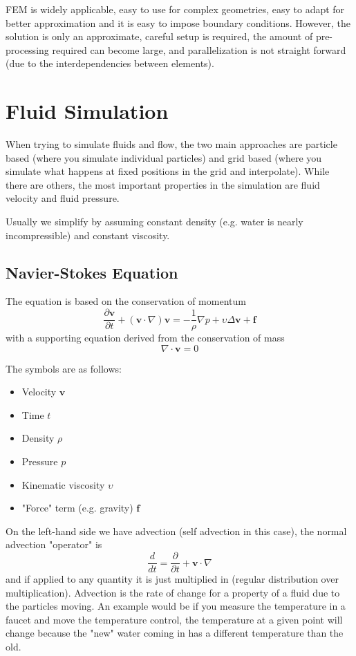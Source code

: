 \documentclass{article}
\begin{document}
FEM is widely applicable, easy to use for complex geometries, easy to adapt for better approximation and it is easy to impose boundary conditions.
However, the solution is only an approximate, careful setup is required, the amount of pre-processing required can become large, and parallelization is not straight forward (due to the interdependencies between elements).

\section{Fluid Simulation}
When trying to simulate fluids and flow, the two main approaches are particle based (where you simulate individual particles) and grid based (where you simulate what happens at fixed positions in the grid and interpolate).
While there are others, the most important properties in the simulation are fluid velocity and fluid pressure.

Usually we simplify by assuming constant density (e.g. water is nearly incompressible) and constant viscosity.

\subsection{Navier-Stokes Equation}
The equation is based on the conservation of momentum
\begin{equation}
    \label{eq:navier}
    \frac{\partial \bm{v}}{\partial t} + (\bm{v} \cdot \nabla)\bm{v} = -\frac{1}{\rho} \nabla p + \upsilon \Delta \bm{v} + \bm{f}
\end{equation}
with a supporting equation derived from the conservation of mass
\begin{equation}
    \nabla \cdot \bm{v} = 0
\end{equation}

The symbols are as follows:
\begin{itemize}
    \item Velocity $\bm{v}$
    \item Time $t$
    \item Density $\rho$
    \item Pressure $p$
    \item Kinematic viscosity $\upsilon$
    \item "Force" term (e.g. gravity) $\bm{f}$
\end{itemize}

On the left-hand side we have advection (self advection in this case), the normal advection "operator" is
\begin{equation}
    \frac{d}{dt} = \frac{\partial}{\partial t} + \bm{v} \cdot \nabla
\end{equation}
and if applied to any quantity it is just multiplied in (regular distribution over multiplication).
Advection is the rate of change for a property of a fluid due to the particles moving.
An example would be if you measure the temperature in a faucet and move the temperature control, the temperature at a given point will change because the "new" water coming in has a different temperature than the old.
\end{document}
